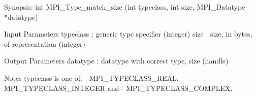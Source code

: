 Synopsis:
int MPI_Type_match_size
   (int typeclass, int size, MPI_Datatype *datatype)

Input Parameters
typeclass : generic type specifier (integer)
size : size, in bytes, of representation (integer)

Output Parameters
datatype : datatype with correct type, size (handle)

Notes
typeclass is one of:
- MPI_TYPECLASS_REAL,
- MPI_TYPECLASS_INTEGER and
- MPI_TYPECLASS_COMPLEX.
